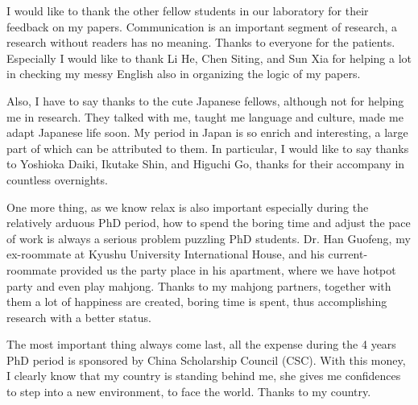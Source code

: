 \documentclass[12pt, twoside, a4paper]{book} %
\begin{document}
I would like to thank the other fellow students in our laboratory for their feedback on my papers. Communication is an important segment of research, a research without readers has no meaning. Thanks to everyone for the patients. Especially I would like to thank Li He, Chen Siting, and Sun Xia for helping a lot in checking my messy English also in organizing the logic of my papers. 

Also, I have to say thanks to the cute Japanese fellows, although not for helping me in research. They talked with me, taught me language and culture, made me adapt Japanese life soon. My period in Japan is so enrich and interesting, a large part of which can be attributed to them. In particular, I would like to say thanks to Yoshioka Daiki, Ikutake Shin, and Higuchi Go, thanks for their accompany in countless overnights.

One more thing, as we know relax is also important especially during the relatively arduous PhD period, how to spend the boring time and adjust the pace of work is always a serious problem puzzling PhD students. Dr. Han Guofeng, my ex-roommate at Kyushu University International House, and his current-roommate provided us the party place in his apartment, where we have hotpot party and even play mahjong. Thanks to my mahjong partners, together with them a lot of happiness are created, boring time is spent, thus accomplishing research with a better status.

The most important thing always come last, all the expense during the 4 years PhD period is sponsored by China Scholarship Council (CSC). With this money, I clearly know that my country is standing behind me, she gives me confidences to step into a new environment, to face the world. Thanks to my country.

\end{document}
